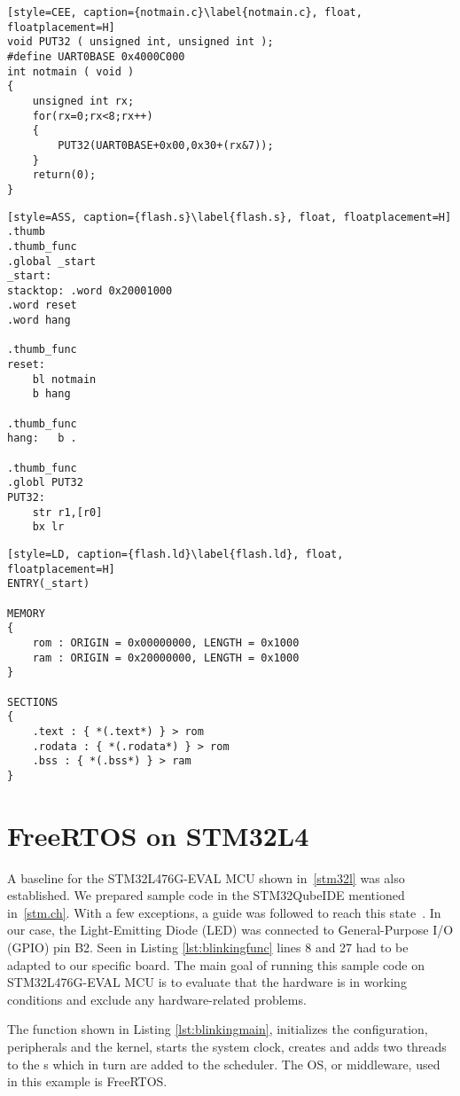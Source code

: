 
\begin{lstlisting}[style=CEE, caption={notmain.c}\label{notmain.c}, float, floatplacement=H]
void PUT32 ( unsigned int, unsigned int );
#define UART0BASE 0x4000C000
int notmain ( void )
{
    unsigned int rx;
    for(rx=0;rx<8;rx++)
    {
        PUT32(UART0BASE+0x00,0x30+(rx&7));
    }
    return(0);
}
\end{lstlisting}

\begin{lstlisting}[style=ASS, caption={flash.s}\label{flash.s}, float, floatplacement=H]
.thumb
.thumb_func
.global _start
_start:
stacktop: .word 0x20001000
.word reset
.word hang

.thumb_func
reset:
    bl notmain
    b hang

.thumb_func
hang:   b .

.thumb_func
.globl PUT32
PUT32:
    str r1,[r0]
    bx lr
\end{lstlisting}

\begin{lstlisting}[style=LD, caption={flash.ld}\label{flash.ld}, float, floatplacement=H]
ENTRY(_start)

MEMORY
{
    rom : ORIGIN = 0x00000000, LENGTH = 0x1000
    ram : ORIGIN = 0x20000000, LENGTH = 0x1000
}

SECTIONS
{
    .text : { *(.text*) } > rom
    .rodata : { *(.rodata*) } > rom
    .bss : { *(.bss*) } > ram
}
\end{lstlisting}

\section{FreeRTOS on STM32L4}

A baseline for the STM32L476G-EVAL MCU shown in~\ref{stm32l} was also established. We prepared sample code in the STM32QubeIDE mentioned in~\ref{stm.ch}. With a few exceptions, a guide was followed to reach this state~\cite{yttutorial}. In our case, the Light-Emitting Diode (LED) was connected to General-Purpose I/O (GPIO) pin B2. Seen in Listing \ref{lst:blinkingfunc} lines 8 and 27 had to be adapted to our specific board. The main goal of running this sample code on STM32L476G-EVAL MCU is to evaluate that the hardware is in working conditions and exclude any hardware-related problems.

The  function shown in Listing \ref{lst:blinkingmain}, initializes the configuration, peripherals and the kernel, starts the system clock, creates and adds two threads to the s which in turn are added to the scheduler. The OS, or middleware, used in this example is FreeRTOS.

